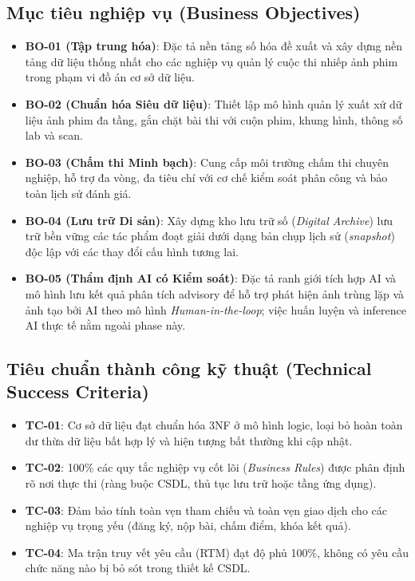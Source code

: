 \subsection{Mục tiêu nghiệp vụ (Business Objectives)}
\begin{itemize}
    \item \textbf{BO-01 (Tập trung hóa)}: Đặc tả nền tảng số hóa đề xuất và xây dựng nền tảng dữ liệu thống nhất cho các nghiệp vụ quản lý cuộc thi nhiếp ảnh phim trong phạm vi đồ án cơ sở dữ liệu.
    \item \textbf{BO-02 (Chuẩn hóa Siêu dữ liệu)}: Thiết lập mô hình quản lý xuất xứ dữ liệu ảnh phim đa tầng, gắn chặt bài thi với cuộn phim, khung hình, thông số lab và scan.
    \item \textbf{BO-03 (Chấm thi Minh bạch)}: Cung cấp môi trường chấm thi chuyên nghiệp, hỗ trợ đa vòng, đa tiêu chí với cơ chế kiểm soát phân công và bảo toàn lịch sử đánh giá.
    \item \textbf{BO-04 (Lưu trữ Di sản)}: Xây dựng kho lưu trữ số (\textit{Digital Archive}) lưu trữ bền vững các tác phẩm đoạt giải dưới dạng bản chụp lịch sử (\textit{snapshot}) độc lập với các thay đổi cấu hình tương lai.
    \item \textbf{BO-05 (Thẩm định AI có Kiểm soát)}: Đặc tả ranh giới tích hợp AI và mô hình lưu kết quả phân tích advisory để hỗ trợ phát hiện ảnh trùng lặp và ảnh tạo bởi AI theo mô hình \textit{Human-in-the-loop}; việc huấn luyện và inference AI thực tế nằm ngoài phase này.
\end{itemize}

\subsection{Tiêu chuẩn thành công kỹ thuật (Technical Success Criteria)}
\begin{itemize}
    \item \textbf{TC-01}: Cơ sở dữ liệu đạt chuẩn hóa 3NF ở mô hình logic, loại bỏ hoàn toàn dư thừa dữ liệu bất hợp lý và hiện tượng bất thường khi cập nhật.
    \item \textbf{TC-02}: 100\% các quy tắc nghiệp vụ cốt lõi (\textit{Business Rules}) được phân định rõ nơi thực thi (ràng buộc CSDL, thủ tục lưu trữ hoặc tầng ứng dụng).
    \item \textbf{TC-03}: Đảm bảo tính toàn vẹn tham chiếu và toàn vẹn giao dịch cho các nghiệp vụ trọng yếu (đăng ký, nộp bài, chấm điểm, khóa kết quả).
    \item \textbf{TC-04}: Ma trận truy vết yêu cầu (RTM) đạt độ phủ 100\%, không có yêu cầu chức năng nào bị bỏ sót trong thiết kế CSDL.
\end{itemize}


